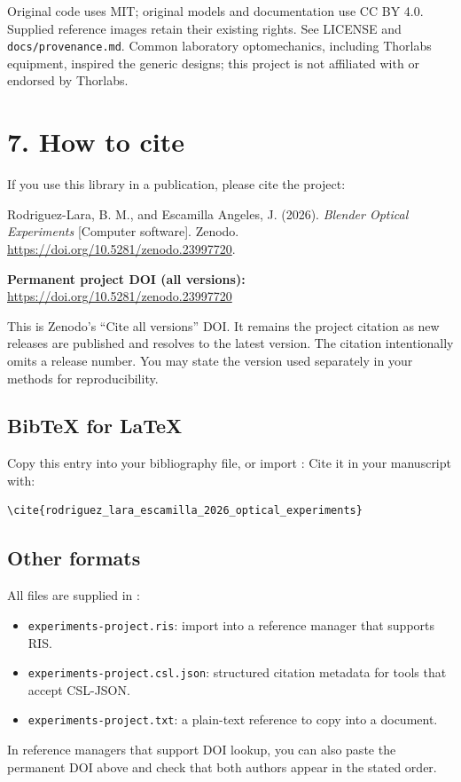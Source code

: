 \documentclass[11pt,a4paper]{article}
\begin{document}
Original code uses MIT; original models and documentation use CC BY 4.0. Supplied reference images retain their existing rights. See LICENSE and \texttt{docs/provenance.md}. Common laboratory optomechanics, including Thorlabs equipment, inspired the generic designs; this project is not affiliated with or endorsed by Thorlabs.


\clearpage
\section*{7. How to cite}
If you use this library in a publication, please cite the project:

Rodriguez-Lara, B. M., and Escamilla Angeles, J. (2026).
\textit{Blender Optical Experiments} [Computer software]. Zenodo.
\url{https://doi.org/10.5281/zenodo.23997720}.

\textbf{Permanent project DOI (all versions):}
\url{https://doi.org/10.5281/zenodo.23997720}

This is Zenodo's ``Cite all versions'' DOI. It remains the project citation as new releases are published and resolves to the latest version. The citation intentionally omits a release number. You may state the version used separately in your methods for reproducibility.

\subsection*{BibTeX for LaTeX}
Copy this entry into your bibliography file, or import
:
Cite it in your manuscript with:
\begin{Verbatim}[fontsize=\small]
\cite{rodriguez_lara_escamilla_2026_optical_experiments}
\end{Verbatim}
\subsection*{Other formats}
All files are supplied in :
\begin{itemize}
\item \texttt{experiments-project.ris}: import into a reference manager that supports RIS.
\item \texttt{experiments-project.csl.json}: structured citation metadata for tools that accept CSL-JSON.
\item \texttt{experiments-project.txt}: a plain-text reference to copy into a document.
\end{itemize}
In reference managers that support DOI lookup, you can also paste the permanent DOI above and check that both authors appear in the stated order.
\end{document}
